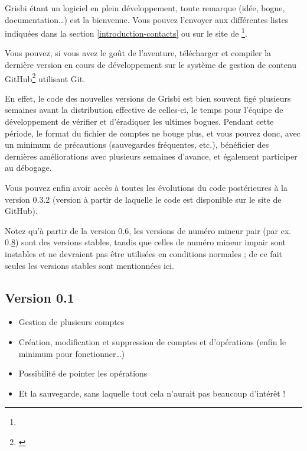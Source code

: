 Grisbi étant un logiciel en plein développement, toute remarque (idée,
bogue, documentation\dots{}) est la bienvenue. Vous pouvez l'envoyer aux différentes listes indiquées dans la section \vref{introduction-contacts}  ou sur le site de \footnote{\urlGrisbi{}}.

Vous pouvez, si vous avez le goût de l'aventure, télécharger et compiler la dernière version en 
cours de développement sur le système de gestion de contenu \gls{GitHub}\footnote{\urlGitHubGrisbi{}\label{siteGitHubGrisbi}} utilisant \gls{Git}.

En effet, le code des nouvelles versions de Grisbi est bien souvent figé
plusieurs semaines avant la distribution effective de celles-ci, le temps pour 
l'équipe de développement de vérifier et d'éradiquer les ultimes bogues. Pendant cette période, le format du fichier de comptes ne bouge plus, et vous pouvez donc, avec un minimum de précautions (sauvegardes fréquentes, etc.), bénéficier des dernières améliorations avec plusieurs semaines d'avance, et également participer au débogage.

Vous pouvez enfin avoir accès à toutes les évolutions du code postérieures à la version 0.3.2 (version à partir de laquelle le code est disponible sur le site de \gls{GitHub}).

Notez qu'à partir de la version 0.6, les versions de numéro mineur pair (par ex. 0.\underline8) sont des versions stables, tandis que celles de numéro mineur impair sont instables et ne devraient pas être utilisées en conditions normales ; de ce fait seules les versions stables sont mentionnées ici.

\newpage

\subsection{Version 0.1}

\begin{itemize}
	\item Gestion de plusieurs comptes
	\item Création, modification et suppression de comptes et d'opérations (enfin le minimum pour fonctionner\dots{})
	\item Possibilité de pointer les opérations
	\item Et la sauvegarde, sans laquelle tout cela n'aurait pas beaucoup d'intérêt !
\end{itemize}

